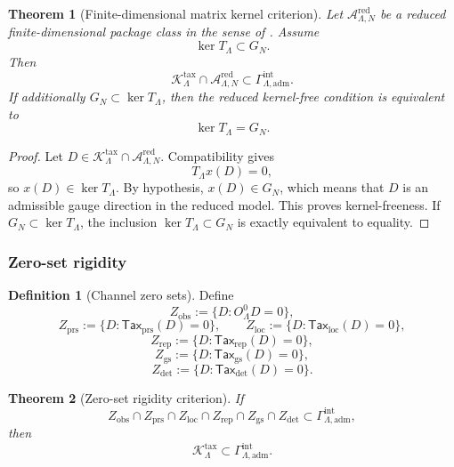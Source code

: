 \documentclass[11pt]{article}
\numberwithin{equation}{section}
\newtheorem{theorem}{Theorem}[section]
\theoremstyle{definition}
\newtheorem{definition}[definition]{Definition}
\theoremstyle{remark}
\newcommand{\adm}{\mathrm{adm}}
\newcommand{\detc}{\mathrm{det}}
\newcommand{\Tax}{\mathsf{Tax}}
\begin{document}
\begin{theorem}[Finite-dimensional matrix kernel criterion]
\label{thm:matrix-kernel-criterion}
Let \(\mathcal A_{\Lambda,N}^{\mathrm{red}}\) be a reduced finite-dimensional
package class in the sense of .  Assume
\[
    \ker T_{\Lambda}\subset G_N.
\]
Then
\[
    \mathcal K_{\Lambda}^{\mathrm{tax}}
    \cap
    \mathcal A_{\Lambda,N}^{\mathrm{red}}
    \subset
    \Gamma_{\Lambda,\adm}^{\mathrm{int}}.
\]
If additionally \(G_N\subset\ker T_{\Lambda}\), then the reduced kernel-free
condition is equivalent to
\[
    \ker T_{\Lambda}=G_N.
\]
\end{theorem}

\begin{proof}
Let \(D\in\mathcal K_{\Lambda}^{\mathrm{tax}}\cap
\mathcal A_{\Lambda,N}^{\mathrm{red}}\).  Compatibility gives
\[
    T_{\Lambda}x(D)=0,
\]
so \(x(D)\in\ker T_{\Lambda}\).  By hypothesis, \(x(D)\in G_N\), which means
that \(D\) is an admissible gauge direction in the reduced model.  This proves
kernel-freeness.  If \(G_N\subset\ker T_{\Lambda}\), the inclusion
\(\ker T_{\Lambda}\subset G_N\) is exactly equivalent to equality.
\end{proof}

\subsubsection{Zero-set rigidity}

\begin{definition}[Channel zero sets]
\label{def:channel-zero-sets}
Define
\[
    Z_{\mathrm{obs}}:=\{D:O^0_{\Lambda}D=0\},
\]
\[
    Z_{\mathrm{prs}}:=\{D:\Tax_{\mathrm{prs}}(D)=0\},
    \qquad
    Z_{\mathrm{loc}}:=\{D:\Tax_{\mathrm{loc}}(D)=0\},
\]
\[
    Z_{\mathrm{rep}}:=\{D:\Tax_{\mathrm{rep}}(D)=0\},
\]
\[
    Z_{\mathrm{gs}}:=\{D:\Tax_{\mathrm{gs}}(D)=0\},
\]
\[
    Z_{\detc}:=\{D:\Tax_{\detc}(D)=0\}.
\]
\end{definition}

\begin{theorem}[Zero-set rigidity criterion]
\label{thm:zero-set-rigidity}
If
\[
    Z_{\mathrm{obs}}
    \cap
    Z_{\mathrm{prs}}
    \cap
    Z_{\mathrm{loc}}
    \cap
    Z_{\mathrm{rep}}
    \cap
    Z_{\mathrm{gs}}
    \cap
    Z_{\detc}
    \subset
    \Gamma_{\Lambda,\adm}^{\mathrm{int}},
\]
then
\[
    \mathcal K_{\Lambda}^{\mathrm{tax}}
    \subset
    \Gamma_{\Lambda,\adm}^{\mathrm{int}}.
\]
\end{theorem}
\end{document}
